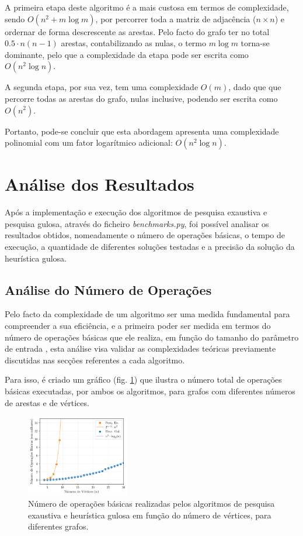 \documentclass[mirror]{revdetua}
\begin{document}
A primeira etapa deste algoritmo é a mais custosa em termos de complexidade, sendo $O(n^2 + m \log m)$, por percorrer toda a matriz de adjacência ($n \times n$) e ordernar de forma descrescente as arestas. Pelo facto do grafo ter no total $0.5 \cdot n(n-1)$ arestas, contabilizando as nulas, o termo $m \log m$ torna-se dominante, pelo que a complexidade da etapa pode ser escrita como $O(n^2 \log n)$.

A segunda etapa, por sua vez, tem uma complexidade $O(m)$, dado que que percorre todas as arestas do grafo, nulas inclusive, podendo ser escrita como $O(n^2)$.

Portanto, pode-se concluir que esta abordagem apresenta uma complexidade polinomial com um fator logarítmico adicional: $O(n^2 \log n)$.

\section{Análise dos Resultados}

Após a implementação e execução dos algoritmos de pesquisa exaustiva e pesquisa gulosa, através do ficheiro \textit{benchmarks.py}, foi possível analisar os resultados obtidos, nomeadamente o número de operações básicas, o tempo de execução, a quantidade de diferentes soluções testadas e a precisão da solução da heurística gulosa.

\subsection{Análise do Número de Operações}

Pelo facto da complexidade de um algoritmo ser uma medida fundamental para compreender a sua eficiência, e a primeira poder ser medida em termos do número de operações básicas que ele realiza, em função do tamanho do parâmetro de entrada \cite{BS22}, esta análise visa validar as complexidades teóricas previamente discutidas nas secções referentes a cada algoritmo.

Para isso, é criado um gráfico (fig. \ref{fig:numeroops}) que ilustra o número total de operações básicas executadas, por ambos os algoritmos, para grafos com diferentes números de arestas e de vértices.

\begin{figure}[h]
    \centering
    \includegraphics[width=0.4\textwidth]{../assets/numberOPS.png}
    \caption{Número de operações básicas realizadas pelos algoritmos de pesquisa exaustiva e heurística gulosa em função do número de vértices, para diferentes grafos.}
    \label{fig:numeroops}
\end{figure}
\end{document}
